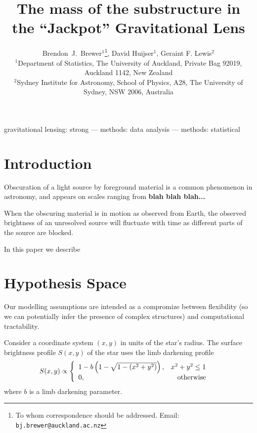 \documentclass[a4paper,fleqn,usenatbib]{mnras}
\title[]
{The mass of the substructure in the ``Jackpot'' Gravitational Lens}
\author[Brewer, Huijser and Lewis]{%
  Brendon~J.~Brewer$^{1}$\thanks{To whom correspondence should be addressed. Email: {\tt bj.brewer@auckland.ac.nz}},
  David Huijser$^{1}$,
  Geraint F. Lewis$^2$
  \medskip\\
  $^1$Department of Statistics, The University of Auckland, Private Bag 92019, Auckland 1142, New Zealand\\
  $^2$Sydney Institute for Astronomy, School of Physics, A28,
  The University of Sydney, NSW 2006, Australia}
\date{}
\begin{document}
\label{firstpage}
\pagerange{\pageref{firstpage}--\pageref{lastpage}}
\maketitle

\begin{abstract}
\end{abstract}

\begin{keywords}
gravitational lensing: strong --- methods: data analysis --- methods: statistical
\end{keywords}



\section{Introduction}
Obscuration of a light source by foreground material is a common
phenomenon in astronomy, and appears on scales ranging from
{\bf blah blah blah...}

When the obscuring material is in motion as observed from Earth,
the observed brightness of an unresolved source will fluctuate with time
as different parts of the source are blocked.

In this paper we describe 



\section{Hypothesis Space}
Our modelling assumptions are intended as a compromize between flexibility
(so we can potentially infer the presence of complex structures)
and computational tractability.

Consider a coordinate system $(x,y)$ in units of the star's radius.
The surface brightness profile
$S(x, y)$ of the star uses the limb darkening profile
\begin{align}
S(x, y) &\propto
    \left\{
        \begin{array}{lr}
            1 - b\left(1 - \sqrt{1 - (x^2 + y^2)}\right),   & x^2+y^2 \leq 1\\
            0, & \textnormal{otherwise}
        \end{array}
    \right.
\end{align}
where $b$ is a limb darkening parameter.
\end{document}
